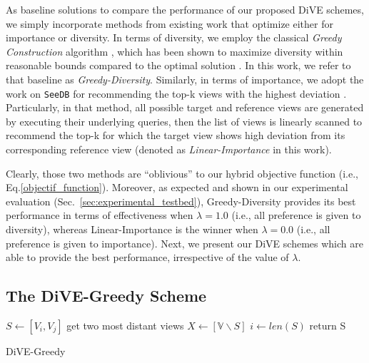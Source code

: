 As baseline solutions to compare the performance of our proposed DiVE schemes, we simply incorporate methods from existing work that optimize either for importance or diversity. 
% 
In terms of diversity, we employ the classical {\em Greedy Construction} algorithm \cite{Smyth2001}, which has been shown to maximize diversity within reasonable bounds compared to the optimal solution \cite{Yu2009, Vieira2011}. 
%
In this work, we refer to that baseline as {\em Greedy-Diversity}. 
%
Similarly, in terms of importance, we adopt the work on {\tt SeeDB} for recommending the top-k views with the highest deviation \cite{Vartak2015, Vartak2014}.
%
Particularly, in that method, all possible target and reference views are generated by executing their underlying queries, then the list of views is linearly scanned to recommend the top-k for which the target view shows high deviation from its corresponding reference view (denoted as {\em Linear-Importance} in this work).
%

Clearly, those two methods are ``oblivious'' to our hybrid objective function (i.e., Eq.\ref{objectif_function}). 
%
%
Moreover, as expected and shown in our experimental evaluation (Sec.~\ref{sec:experimental_testbed}), Greedy-Diversity provides its best performance in terms of effectiveness when $\lambda=1.0$ (i.e., all preference is given to diversity), whereas Linear-Importance is the winner when $\lambda=0.0$ (i.e., all preference is given to importance). 
%
Next, we present our DiVE schemes which are able to provide the best performance, irrespective of the value of $\lambda$.



\subsection{The DiVE-Greedy Scheme}\label{subsec:dive-greedy}

\setlength{\textfloatsep}{0pt}%
\begin{algorithm}[t]
\DontPrintSemicolon
	$S \leftarrow \left[V_i, V_j\right] $ get  two most distant views\;
	$X \leftarrow  \left[\mathbb{V} \backslash S\right]$\;
	$i \leftarrow len\left(S\right) $\;
	return S
	\caption{DiVE-Greedy}
	\label{DiVE-Greedy}
\end{algorithm}

